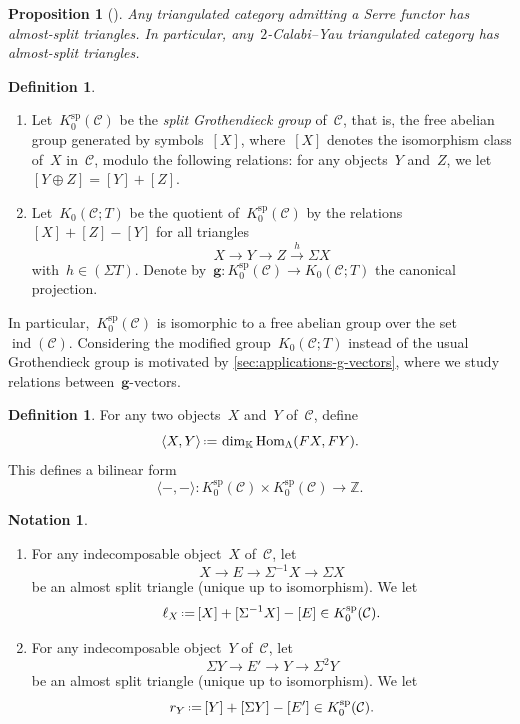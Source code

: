 \documentclass{amsart}
\newtheorem{proposition}[theorem]{Proposition}
\theoremstyle{definition}
\newtheorem{definition}[theorem]{Definition}
\newtheorem{notation}[theorem]{Notation}
\newcommand{\Z}{\mathbb{Z}} %
\renewcommand{\b}[1]{{\boldsymbol{#1}}} %
\newcommand{\eqdef}{\mbox{\,\raisebox{0.2ex}{\scriptsize\ensuremath{\mathrm:}}\ensuremath{=}\,}} %
\newcommand{\darkblue}{\color{darkblue}} %
\newcommand{\defn}[1]{\textsl{\darkblue #1}} %
\newcommand{\field}{\mathbb{K}}
\newcommand{\cat}{\mathcal{C}}
\newcommand{\Hom}[1]{\operatorname{Hom}_{#1}}
\newcommand{\susp}{\Sigma}
\newcommand{\spl}{\operatorname{sp}}
\newcommand{\Ksp}{K_0^{\spl}}
\newcommand{\ind}{\operatorname{ind}}
\begin{document}
\begin{proposition}[{\cite[Prop.~I.2.3]{ReitenVandenbergh}}]
Any triangulated category admitting a Serre functor has almost-split triangles. In particular, any~$2$-Calabi--Yau triangulated category has almost-split triangles.
\end{proposition}

\begin{definition}
\label{def:grothendieck-group}
\begin{enumerate}
\item Let~$\Ksp(\cat)$ be the \defn{split Grothendieck group} of~$\cat$, that is, the free abelian group generated by symbols~$[X]$, where~$[X]$ denotes the isomorphism class of~$X$ in~$\cat$, modulo the following relations: for any objects~$Y$ and~$Z$, we let~$[Y\oplus Z] = [Y] + [Z]$. 
  
\item Let~$K_0(\cat ; T)$ be the quotient of~$\Ksp(\cat)$ by the relations~$[X]+[Z]-[Y]$ for all triangles
\[
X\xrightarrow{} Y \xrightarrow{} Z \xrightarrow{h} \susp X
\]
with~$h \in (\susp T)$. Denote by~$\b{g}:\Ksp(\cat) \to K_0(\cat ; T)$ the canonical projection.
\end{enumerate}
\end{definition}

In particular,~$\Ksp(\cat)$ is isomorphic to a free abelian group over the set~$\ind(\cat)$. Considering the modified group~$K_0(\cat ; T)$ instead of the usual Grothendieck group is motivated by \cref{sec:applications-g-vectors}, where we study relations between~$\b{g}$-vectors.

\begin{definition}
\label{def:bilinear form}
For any two objects~$X$ and~$Y$ of~$\cat$, define
\[
\langle X, Y \rangle \eqdef \dim_{\field} \Hom{\Lambda}(FX,FY).
\]
This defines a bilinear form
\[
\langle -,-\rangle : \Ksp(\cat) \times \Ksp(\cat) \xrightarrow{} \Z.
\]
\end{definition}

\begin{notation}
\label{notation:ell_X}
\begin{enumerate}
\item For any indecomposable object~$X$ of~$\cat$, let
\[
X \to E \to \susp^{-1} X \to \susp X
\]
be an almost split triangle (unique up to isomorphism). We let
\[
\ell_X \eqdef [X] + [\susp^{-1} X]  - [E] \in \Ksp(\cat).
\]
 
\item For any indecomposable object~$Y$ of~$\cat$, let
\[
\susp Y \to E' \to  Y \to \susp^2 Y
\]
be an almost split triangle (unique up to isomorphism). We let
\[
r_Y \eqdef [Y] + [\susp Y]  - [E'] \in \Ksp(\cat).
\]
\end{enumerate}
\end{notation}
\end{document}
